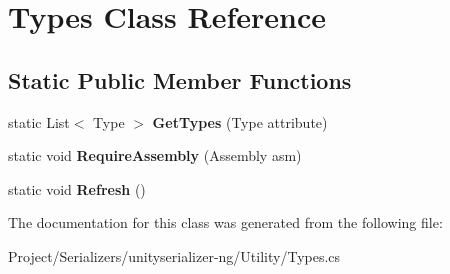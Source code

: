 \hypertarget{class_types}{}\section{Types Class Reference}
\label{class_types}
\subsection*{Static Public Member Functions}
\begin{DoxyCompactItemize}
\item 
\mbox{\label{class_types_a05d02b649323af054607953d55099f65}} 
static List$<$ Type $>$ {\bfseries Get\+Types} (Type attribute)
\item 
\mbox{\label{class_types_a157e849f1304407e36661a88d1e2232a}} 
static void {\bfseries Require\+Assembly} (Assembly asm)
\item 
\mbox{\label{class_types_a4b66ac1c7bbb19873c851c1967ee2060}} 
static void {\bfseries Refresh} ()
\end{DoxyCompactItemize}


The documentation for this class was generated from the following file\+:\begin{DoxyCompactItemize}
\item 
Project/\+Serializers/unityserializer-\/ng/\+Utility/Types.\+cs\end{DoxyCompactItemize}
